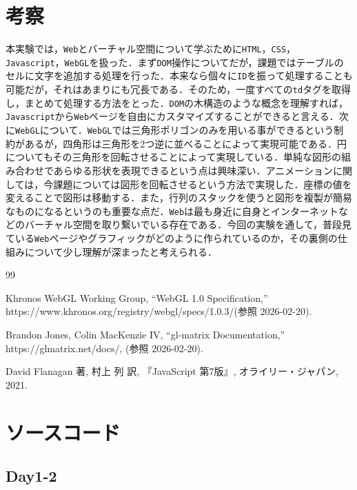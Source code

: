 \documentclass[paper=a4, fontsize=10pt]{jlreq}
\begin{document}
\section{考察}
本実験では，\verb|Web|とバーチャル空間について学ぶために\verb|HTML|，\verb|CSS|，\verb|Javascript|，\verb|WebGL|を扱った．まず\verb|DOM|操作についてだが，課題ではテーブルのセルに文字を追加する処理を行った．本来なら個々に\verb|ID|を振って処理することも可能だが，それはあまりにも冗長である．そのため，一度すべての\verb|td|タグを取得し，まとめて処理する方法をとった．\verb|DOM|の木構造のような概念を理解すれば，\verb|Javascript|から\verb|Web|ページを自由にカスタマイズすることができると言える．次に\verb|WebGL|について．\verb|WebGL|では三角形ポリゴンのみを用いる事ができるという制約があるが，四角形は三角形を$2$つ逆に並べることによって実現可能である．円についてもその三角形を回転させることによって実現している．単純な図形の組み合わせであらゆる形状を表現できるという点は興味深い．アニメーションに関しては，今課題については図形を回転させるという方法で実現した．座標の値を変えることで図形は移動する．また，行列のスタックを使うと図形を複製が簡易なものになるというのも重要な点だ．\verb|Web|は最も身近に自身とインターネットなどのバーチャル空間を取り繋いでいる存在である．今回の実験を通して，普段見ている\verb|Web|ページやグラフィックがどのように作られているのか，その裏側の仕組みについて少し理解が深まったと考えられる．
\begin{thebibliography}{99}

  Khronos WebGL Working Group, ``WebGL 1.0 Specification,''  https://www.khronos.org/registry/webgl/specs/1.0.3/(参照 2026-02-20).

  Brandon Jones, Colin MacKenzie IV, ``gl-matrix Documentation,'' https://glmatrix.net/docs/, (参照 2026-02-20).

  David Flanagan 著, 村上 列 訳, 『JavaScript 第7版』, オライリー・ジャパン, 2021.
\end{thebibliography}

\newpage
\appendix
\section{ソースコード}

\subsection*{Day1-2}



\end{document}
